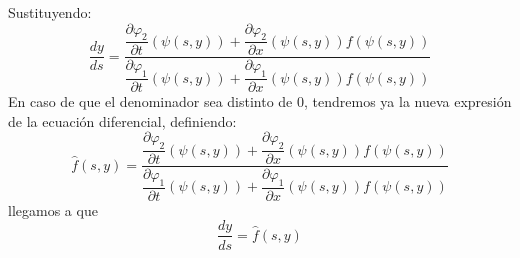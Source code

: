 Sustituyendo:
\begin{equation*}
    \dfrac{dy}{ds} = \dfrac{\dfrac{\partial\varphi_2}{\partial t}(\psi(s,y)) + \dfrac{\partial\varphi_2}{\partial x}(\psi(s,y))f(\psi(s,y))}{\dfrac{\partial\varphi_1}{\partial t}(\psi(s,y)) + \dfrac{\partial\varphi_1}{\partial x}(\psi(s,y)) f(\psi(s,y))}
\end{equation*}
En caso de que el denominador sea distinto de 0, tendremos ya la nueva expresión de la ecuación diferencial, definiendo:
\begin{equation*}
    \hat{f}(s,y) = \dfrac{\dfrac{\partial\varphi_2}{\partial t}(\psi(s,y)) + \dfrac{\partial\varphi_2}{\partial x}(\psi(s,y))f(\psi(s,y))}{\dfrac{\partial\varphi_1}{\partial t}(\psi(s,y)) + \dfrac{\partial\varphi_1}{\partial x}(\psi(s,y)) f(\psi(s,y))}
\end{equation*}
llegamos a que
\begin{equation*}
    \dfrac{dy}{ds} = \hat{f}(s,y)
\end{equation*}

